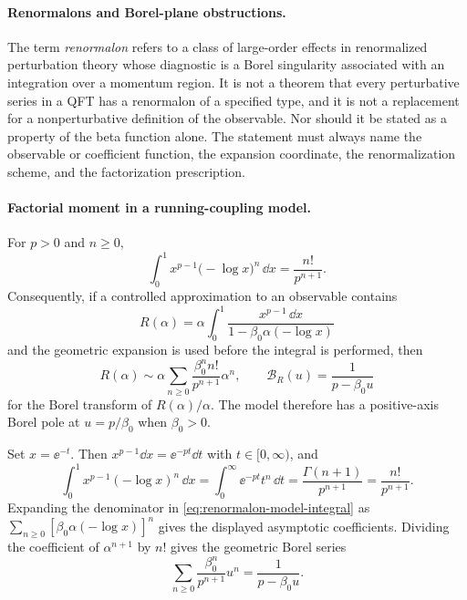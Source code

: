 \paragraph{Renormalons and Borel-plane obstructions.}
\label{rem:renormalons-borel-plane-obstructions}
The term \emph{renormalon} refers to a class of large-order effects in
renormalized perturbation theory whose diagnostic is a Borel singularity
associated with an integration over a momentum region.  It is not a theorem
that every perturbative series in a QFT has a renormalon of a specified type,
and it is not a replacement for a nonperturbative definition of the observable.
Nor should it be stated as a property of the beta function alone.  The
statement must always name the observable or coefficient function, the
expansion coordinate, the renormalization scheme, and the factorization
prescription.

\paragraph{Factorial moment in a running-coupling model.}
For \(p>0\) and \(n\ge0\),
\begin{equation}
  \int_0^1 x^{p-1}\bigl(-\log x\bigr)^n\,\dd x
  =
  \frac{n!}{p^{n+1}} .
  \label{eq:renormalon-factorial-moment}
\end{equation}
Consequently, if a controlled approximation to an observable contains
\begin{equation}
  R(\alpha)
  =
  \alpha\int_0^1
  \frac{x^{p-1}\,\dd x}
       {1-\beta_0\alpha(-\log x)}
  \label{eq:renormalon-model-integral}
\end{equation}
and the geometric expansion is used before the integral is performed, then
\begin{equation}
  R(\alpha)
  \sim
  \alpha\sum_{n\ge0}
  \frac{\beta_0^n n!}{p^{n+1}}\alpha^n,
  \qquad
  \mathcal B_R(u)=\frac{1}{p-\beta_0 u}
  \label{eq:renormalon-model-borel-pole}
\end{equation}
for the Borel transform of \(R(\alpha)/\alpha\).  The model therefore has a
positive-axis Borel pole at \(u=p/\beta_0\) when \(\beta_0>0\).

Set \(x=\ee^{-t}\).  Then \(x^{p-1}\dd x=\ee^{-pt}\dd t\) with \(t\in[0,\infty)\),
and
\[
  \int_0^1 x^{p-1}(-\log x)^n\,\dd x
  =
  \int_0^\infty \ee^{-pt}t^n\,\dd t
  =
  \frac{\Gamma(n+1)}{p^{n+1}}
  =
  \frac{n!}{p^{n+1}}.
\]
Expanding the denominator in
\eqref{eq:renormalon-model-integral} as
\(\sum_{n\ge0}[\beta_0\alpha(-\log x)]^n\) gives the displayed asymptotic
coefficients.  Dividing the coefficient of \(\alpha^{n+1}\) by \(n!\) gives
the geometric Borel series
\[
  \sum_{n\ge0}\frac{\beta_0^n}{p^{n+1}}u^n
  =
  \frac1{p-\beta_0 u}.
\]

